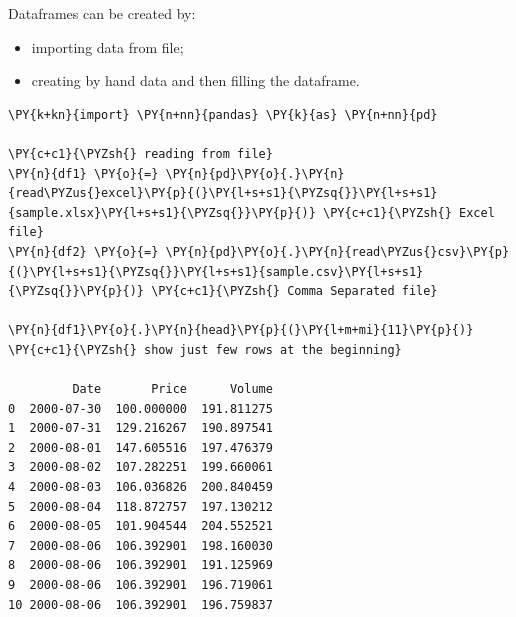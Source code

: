 Dataframes can be created by:
\begin{itemize}
\item importing data from file;
\item creating by hand data and then filling the dataframe.
\end{itemize}

\begin{tcolorbox}[breakable, size=fbox, boxrule=1pt, pad at break*=1mm,colback=cellbackground, colframe=cellborder]
\begin{Verbatim}[commandchars=\\\{\}]
\PY{k+kn}{import} \PY{n+nn}{pandas} \PY{k}{as} \PY{n+nn}{pd}

\PY{c+c1}{\PYZsh{} reading from file}
\PY{n}{df1} \PY{o}{=} \PY{n}{pd}\PY{o}{.}\PY{n}{read\PYZus{}excel}\PY{p}{(}\PY{l+s+s1}{\PYZsq{}}\PY{l+s+s1}{sample.xlsx}\PY{l+s+s1}{\PYZsq{}}\PY{p}{)} \PY{c+c1}{\PYZsh{} Excel file}
\PY{n}{df2} \PY{o}{=} \PY{n}{pd}\PY{o}{.}\PY{n}{read\PYZus{}csv}\PY{p}{(}\PY{l+s+s1}{\PYZsq{}}\PY{l+s+s1}{sample.csv}\PY{l+s+s1}{\PYZsq{}}\PY{p}{)} \PY{c+c1}{\PYZsh{} Comma Separated file}

\PY{n}{df1}\PY{o}{.}\PY{n}{head}\PY{p}{(}\PY{l+m+mi}{11}\PY{p}{)} \PY{c+c1}{\PYZsh{} show just few rows at the beginning}

         Date       Price      Volume
0  2000-07-30  100.000000  191.811275
1  2000-07-31  129.216267  190.897541
2  2000-08-01  147.605516  197.476379
3  2000-08-02  107.282251  199.660061
4  2000-08-03  106.036826  200.840459
5  2000-08-04  118.872757  197.130212
6  2000-08-05  101.904544  204.552521
7  2000-08-06  106.392901  198.160030
8  2000-08-06  106.392901  191.125969
9  2000-08-06  106.392901  196.719061
10 2000-08-06  106.392901  196.759837
\end{Verbatim}
\end{tcolorbox}

